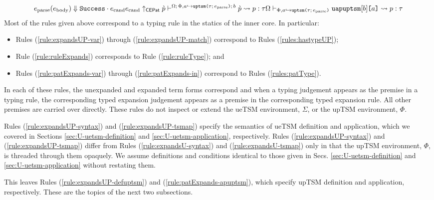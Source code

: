 {{{{\begin{subequations}
\begin{equation}
{  e_\text{parse}(e_\text{body}) \Downarrow \mathtt{Success} \cdot e_\text{cand}\\
  e_\text{cand}\uparrow_\mathsf{CEPat} \grave{p}\\\\
  \vdash^{\Omega;\,\Phi, a \hookrightarrow \texttt{uptsm}\texttt{(}\tau;\,e_\text{parse}\texttt{)};\,b} \grave{p}\leadsto p : \tau
}{
  \Omega\vdash_{\Phi, a \hookrightarrow \texttt{uptsm}\texttt{(}\tau;\,e_\text{parse}\texttt{)}} \texttt{uapuptsm}[b]\texttt{[}a\texttt{]} \leadsto p : \tau
}
\end{equation}
\end{subequations}
Most of the rules given above correspond to a typing rule in the statics of the inner core. In particular:
\begin{itemize}
\item Rules (\ref{rule:expandsUP-var}) through (\ref{rule:expandsUP-match}) correspond to Rules (\ref{rules:hastypeUP}); 
\item Rule (\ref{rule:ruleExpands}) corresponds to Rule (\ref{rule:ruleType}); and
\item Rules (\ref{rule:patExpands-var}) through (\ref{rule:patExpands-in}) correspond to Rules (\ref{rules:patType}).
\end{itemize}
In each of these rules, the unexpanded and expanded term forms correspond and when a typing judgement appears as the premise in a typing rule, the corresponding typed expansion judgement appears as a premise in the corresponding typed expansion rule. All other premises are carried over directly. These rules do not inspect or extend the ueTSM environment, $\Sigma$, or the upTSM environment, $\Phi$.

Rules (\ref{rule:expandsUP-syntax}) and (\ref{rule:expandsUP-tsmap}) specify the semantics of ueTSM definition and application, which we covered in Sections \ref{sec:U-uetsm-definition} and \ref{sec:U-uetsm-application}, respectively. Rules (\ref{rule:expandsUP-syntax}) and (\ref{rule:expandsUP-tsmap}) differ from Rules (\ref{rule:expandsU-syntax}) and (\ref{rule:expandsU-tsmap}) only in that the upTSM environment, $\Phi$, is threaded through them opaquely. We assume definitions and conditions identical to those given in Secs. \ref{sec:U-uetsm-definition} and \ref{sec:U-uetsm-application} without restating them.

This leaves Rules (\ref{rule:expandsUP-defuptsm}) and (\ref{rule:patExpands-apuptsm}), which specify upTSM definition and application, respectively. These are the topics of the next two subsections.
}}}}
